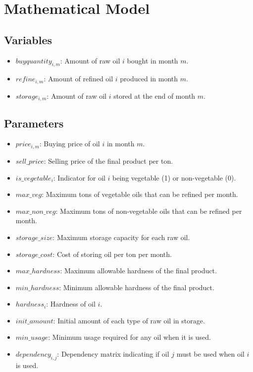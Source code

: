 \documentclass{article}
\begin{document}
\section*{Mathematical Model}

\subsection*{Variables}
\begin{itemize}
    \item \( buyquantity_{i,m} \): Amount of raw oil \( i \) bought in month \( m \).
    \item \( refine_{i,m} \): Amount of refined oil \( i \) produced in month \( m \).
    \item \( storage_{i,m} \): Amount of raw oil \( i \) stored at the end of month \( m \).
\end{itemize}

\subsection*{Parameters}
\begin{itemize}
    \item \( price_{i,m} \): Buying price of oil \( i \) in month \( m \).
    \item \( sell\_price \): Selling price of the final product per ton.
    \item \( is\_vegetable_{i} \): Indicator for oil \( i \) being vegetable (1) or non-vegetable (0).
    \item \( max\_veg \): Maximum tons of vegetable oils that can be refined per month.
    \item \( max\_non\_veg \): Maximum tons of non-vegetable oils that can be refined per month.
    \item \( storage\_size \): Maximum storage capacity for each raw oil.
    \item \( storage\_cost \): Cost of storing oil per ton per month.
    \item \( max\_hardness \): Maximum allowable hardness of the final product.
    \item \( min\_hardness \): Minimum allowable hardness of the final product.
    \item \( hardness_{i} \): Hardness of oil \( i \).
    \item \( init\_amount \): Initial amount of each type of raw oil in storage.
    \item \( min\_usage \): Minimum usage required for any oil when it is used.
    \item \( dependency_{i,j} \): Dependency matrix indicating if oil \( j \) must be used when oil \( i \) is used.
\end{itemize}
\end{document}
